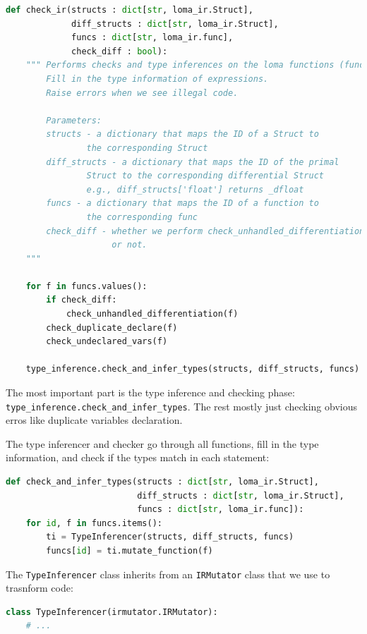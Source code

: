 \begin{lstlisting}[language=Python]
def check_ir(structs : dict[str, loma_ir.Struct],
             diff_structs : dict[str, loma_ir.Struct],
             funcs : dict[str, loma_ir.func],
             check_diff : bool):
    """ Performs checks and type inferences on the loma functions (funcs).
        Fill in the type information of expressions.
        Raise errors when we see illegal code.

        Parameters:
        structs - a dictionary that maps the ID of a Struct to 
                the corresponding Struct
        diff_structs - a dictionary that maps the ID of the primal
                Struct to the corresponding differential Struct
                e.g., diff_structs['float'] returns _dfloat
        funcs - a dictionary that maps the ID of a function to 
                the corresponding func
        check_diff - whether we perform check_unhandled_differentiation
                     or not.
    """

    for f in funcs.values():
        if check_diff:
            check_unhandled_differentiation(f)
        check_duplicate_declare(f)
        check_undeclared_vars(f)

    type_inference.check_and_infer_types(structs, diff_structs, funcs)
\end{lstlisting}

The most important part is the type inference and checking phase: \lstinline{type_inference.check_and_infer_types}. The rest mostly just checking obvious erros like duplicate variables declaration.

The type inferencer and checker go through all functions, fill in the type information, and check if the types match in each statement:
\begin{lstlisting}[language=Python]
def check_and_infer_types(structs : dict[str, loma_ir.Struct],
                          diff_structs : dict[str, loma_ir.Struct],
                          funcs : dict[str, loma_ir.func]):
    for id, f in funcs.items():
        ti = TypeInferencer(structs, diff_structs, funcs)
        funcs[id] = ti.mutate_function(f)
\end{lstlisting}

The \lstinline{TypeInferencer} class inherits from an \lstinline{IRMutator} class that we use to trasnform code:
\begin{lstlisting}[language=Python]
class TypeInferencer(irmutator.IRMutator):
    # ...
\end{lstlisting}

